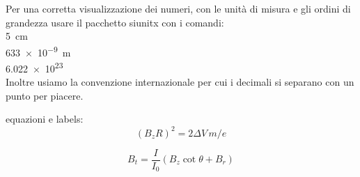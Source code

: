 \documentclass[a4paper,11pt]{article}
\begin{document}
	
	Per una corretta visualizzazione dei numeri, con le unità di misura e gli ordini di grandezza usare il pacchetto siunitx con i comandi:\\
	
		\SI{5}{\centi\meter}
	\\
		\SI{633e-9}{\meter}
	\\
		\num{6.022e23}
	\\
	Inoltre usiamo la convenzione internazionale per cui i decimali si separano con un punto per piacere.
	
	equazioni e labels:
	\begin{equation}\label{regressione}  %
	(B_z R)^2 = 2\Delta V \, m/e 
	\end{equation}
	
	\begin{equation}\label{B_terra}    %
	B_t= \frac{I}{I_0} (B_z \cot \theta + B_r) 
	\end{equation}

	
\end{document}

